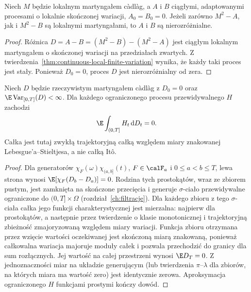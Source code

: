 \begin{lemat}
\label{lem:continuous-compensator-unique}
Niech $M$ będzie lokalnym martyngałem c\`adl\`ag, a $A$ i $B$
ciągłymi, adaptowanymi procesami o lokalnie skończonej wariacji,
$A_0=B_0=0$. Jeżeli zarówno $M^2-A$, jak i $M^2-B$
są lokalnymi martyngałami, to $A$ i $B$ są nierozróżnialne.
\end{lemat}
\begin{proof}
Różnica $D=A-B=(M^2-B)-(M^2-A)$ jest ciągłym
lokalnym martyngałem o skończonej wariacji na przedziałach
zwartych. Z twierdzenia~\ref{thm:continuous-local-finite-variation}
wynika, że każdy taki proces jest stały. Ponieważ $D_0=0$,
proces $D$ jest nierozróżnialny od zera.
\end{proof}

\begin{lemat}
\label{lem:predictable-fv-mean-zero}
Niech $D$ będzie rzeczywistym martyngałem c\`adl\`ag
z $D_0=0$ oraz $\E\operatorname{Var}_{[0,T]}(D)<\infty$.
Dla każdego ograniczonego procesu przewidywalnego $H$
zachodzi
\[
\E\int_{(0,T]} H_t\,\mathrm dD_t=0.
\]
Całka jest tutaj zwykłą trajektoryjną całką
względem miary znakowanej Lebesgue'a--Stieltjesa,
a nie całką It\^o.
\end{lemat}
\begin{proof}
Dla generatorów $\chi_F(\omega)\chi_{(a,b]}(t)$,
$F\in\calF_a$ i $0\le a<b\le T$, lewa strona
wynosi $\E[\chi_F(D_b-D_a)]=0$.
Rodzina tych prostokątów, wraz ze zbiorem pustym,
jest zamknięta na skończone przecięcia i generuje
$\sigma$-ciało przewidywalne ograniczone do
$(0,T]\times\Omega$ (rozdział~\ref{ch:filtracje}).
Dla każdego zbioru z tego $\sigma$-ciała całka
jego funkcji charakterystycznej jest mierzalna:
najpierw dla prostokątów, a następnie przez
twierdzenie o klasie monotonicznej i trajektoryjną
zbieżność zmajoryzowaną względem miary wariacji.
Funkcja zbioru otrzymana przez wzięcie wartości
oczekiwanej jest skończoną miarą znakowaną,
ponieważ całkowalna wariacja majoruje moduły
całek i pozwala przechodzić do granicy dla
sum rozłącznych. Jej wartość na całej przestrzeni
wynosi $\E D_T=0$. Z jednoznaczności miar
na układzie generującym (lub twierdzenia
$\pi$--$\lambda$ dla zbiorów, na których
miara ma wartość zero) jest identycznie zerowa.
Aproksymacja ograniczonego $H$ funkcjami
prostymi kończy dowód.
\end{proof}

